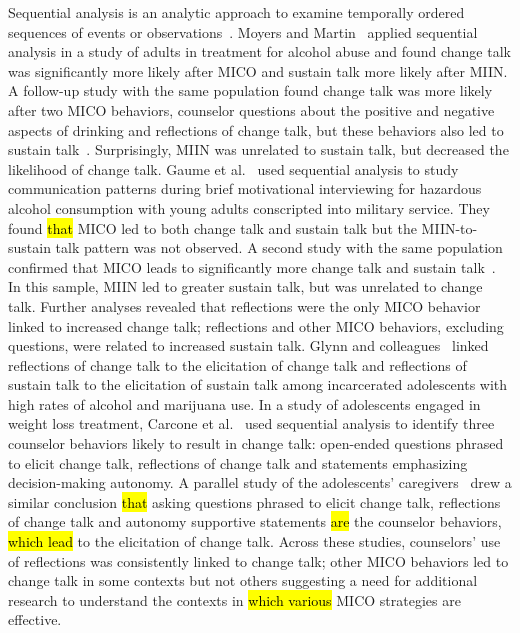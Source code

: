 Sequential analysis is an analytic approach to examine temporally ordered sequences of events or observations~\cite{bakeman1997observing, bakeman2011sequential}. Moyers and Martin~\cite{moyers2006therapist} applied sequential analysis in a study of adults in treatment for alcohol abuse and found change talk was significantly more likely after MICO and sustain talk more likely after MIIN. A follow-up study with the same population found change talk was more likely after two MICO behaviors, counselor questions about the positive and negative aspects of drinking and reflections of change talk, but these behaviors also led to sustain talk~\cite{moyers2009session}. Surprisingly, MIIN was unrelated to sustain talk, but decreased the likelihood of change talk. Gaume et al.~\cite{gaume2008counsellor} used sequential analysis to study communication patterns during brief motivational interviewing for hazardous alcohol consumption with young adults conscripted into military service. They found \hl{that} MICO led to both change talk and sustain talk but the MIIN-to-sustain talk pattern was not observed. A second study with the same population confirmed that MICO leads to significantly more change talk and sustain talk~\cite{gaume2010counselor}. In this sample, MIIN led to greater sustain talk, but was unrelated to change talk. Further analyses revealed that reflections were the only MICO behavior linked to increased change talk; reflections and other MICO behaviors, excluding questions, were related to increased sustain talk. Glynn and colleagues~\cite{glynn2014change} linked reflections of change talk to the elicitation of change talk and reflections of sustain talk to the elicitation of sustain talk among incarcerated adolescents with high rates of alcohol and marijuana use. In a study of adolescents engaged in weight loss treatment, Carcone et al.~\cite{carcone2013provider} used sequential analysis to identify three counselor behaviors likely to result in change talk: open-ended questions phrased to elicit change talk, reflections of change talk and statements emphasizing decision-making autonomy. A parallel study of the adolescents' caregivers~\cite{jacques2016building} drew a similar conclusion \hl{that} asking questions phrased to elicit change talk, reflections of change talk and autonomy supportive statements \hl{are} the counselor behaviors, \hl{which lead} to the elicitation of change talk. Across these studies, counselors' use of reflections was consistently linked to change talk; other MICO behaviors led to change talk in some contexts but not others suggesting a need for additional research to understand the contexts in \hl{which various} MICO strategies are effective. 

